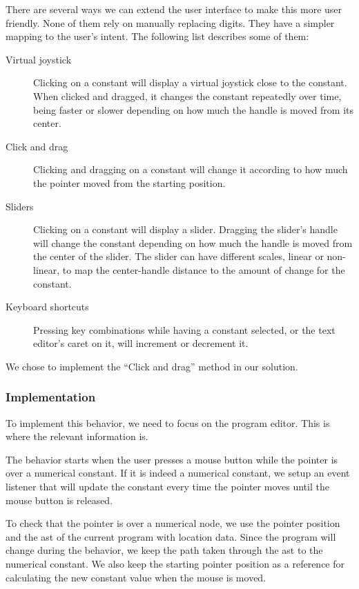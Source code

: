 There are several ways we can extend the user interface to make this more user friendly.
None of them rely on manually replacing digits.
They have a simpler mapping to the user's intent.
The following list describes some of them:

\begin{description}
  \item[Virtual joystick] Clicking on a constant will display a virtual joystick close to the constant. When clicked and dragged, it changes the constant repeatedly over time, being faster or slower depending on how much the handle is moved from its center.
  \item[Click and drag] Clicking and dragging on a constant will change it according to how much the pointer moved from the starting position.
  \item[Sliders] Clicking on a constant will display a slider. Dragging the slider's handle will change the constant depending on how much the handle is moved from the center of the slider. The slider can have different scales, linear or non-linear, to map the center-handle distance to the amount of change for the constant.
  \item[Keyboard shortcuts] Pressing key combinations while having a constant selected, or the text editor's caret on it, will increment or decrement it.
\end{description}

We chose to implement the ``Click and drag'' method in our solution.

\subsubsection{Implementation}
To implement this behavior, we need to focus on the program editor.
This is where the relevant information is.

The behavior starts when the user presses a mouse button while the pointer is over a numerical constant.
If it is indeed a numerical constant, we setup an event listener that will update the constant every time the pointer moves until the mouse button is released.

To check that the pointer is over a numerical node, we use the pointer position and the \gls{ast} of the current program with location data.
Since the program will change during the behavior, we keep the path taken through the \gls{ast} to the numerical constant.
We also keep the starting pointer position as a reference for calculating the new constant value when the mouse is moved.

